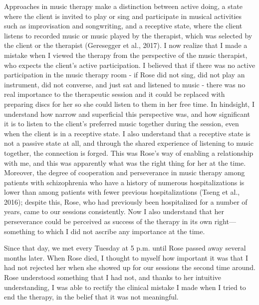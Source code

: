 \documentclass[authordate, empirical]{jote-new-article}
\begin{document}
Approaches in music therapy make a distinction between active doing, a state where the client is invited to play or sing and participate in musical activities such as improvisation and songwriting, and a receptive state, where the client listens to recorded music or music played by the therapist, which was selected by the client or the therapist (Geresegger et al., 2017). I now realize that I made a mistake when I viewed the therapy from the perspective of the music therapist, who expects the client's active participation. I believed that if there was no active participation in the music therapy room - if Rose did not sing, did not play an instrument, did not converse, and just sat and listened to music - there was no real importance to the therapeutic session and it could be replaced with preparing discs for her so she could listen to them in her free time. In hindsight, I understand how narrow and superficial this perspective was, and how significant it is to listen to the client's preferred music together during the session, even when the client is in a receptive state. I also understand that a receptive state is not a passive state at all, and through the shared experience of listening to music together, the connection is forged. This was Rose's way of enabling a relationship with me, and this was apparently what was the right thing for her at the time. Moreover, the degree of cooperation and perseverance in music therapy among patients with schizophrenia who have a history of numerous hospitalizations is lower than among patients with fewer previous hospitalizations (Tseng et al., 2016); despite this, Rose, who had previously been hospitalized for a number of years, came to our sessions consistently. Now I also understand that her perseverance could be perceived as success of the therapy in its own right—something to which I did not ascribe any importance at the time.



Since that day, we met every Tuesday at 5 p.m. until Rose passed away several months later. When Rose died, I thought to myself how important it was that I had not rejected her when she showed up for our sessions the second time around. Rose understood something that I had not, and thanks to her intuitive understanding, I was able to rectify the clinical mistake I made when I tried to end the therapy, in the belief that it was not meaningful.
\end{document}
